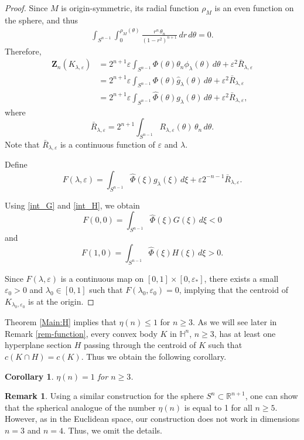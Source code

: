 \documentclass[12pt,letterpaper,reqno]{amsart}
\newtheorem{corollary}[theorem]{Corollary}
\theoremstyle{definition}
\newtheorem{remark}[theorem]{Remark}
\begin{document}
\begin{proof}
Since $M$ is origin-symmetric, its radial function $\rho_M$ is an even function on the sphere, and thus
\begin{align*}  \int_{S^{n-1}}\int_0^{\rho_M(\theta)}   \frac{r^n\, \theta_n}{(1-r^2)^{n+1}}\,dr\, d\theta=0.
\end{align*}
Therefore,
\begin{align*}	\bm{Z}_n({K_{\lambda,\varepsilon}}) 
	& =  2^{n+1}\varepsilon \int_{S^{n-1}}  \Phi(\theta) \theta_n\phi_{\lambda}(\theta) \, d\theta + \varepsilon^2 \bar R_{\lambda,\varepsilon}\\
		& =  2^{n+1}\varepsilon \int_{S^{n-1}}  \Phi(\theta) \widehat g_{\lambda}(\theta) \, d\theta + \varepsilon^2 \bar R_{\lambda,\varepsilon}\\
				& =  2^{n+1}\varepsilon \int_{S^{n-1}}  \widehat \Phi(\theta)  g_{\lambda}(\theta) \, d\theta + \varepsilon^2 \bar R_{\lambda,\varepsilon},
\end{align*}
where
$$  \bar R_{\lambda,\varepsilon} = 2^{n+1}\int_{S^{n-1}} R_{\lambda,\varepsilon}(\theta)\, \theta_n \, d\theta.$$
Note that $\bar R_{\lambda,\varepsilon}$ is a continuous function of $\varepsilon$ and $\lambda$. 

	Define
	$$F(\lambda,\varepsilon)=\int_{S^{n-1}} \widehat\Phi(\xi) g_\lambda (\xi) \, d\xi+\varepsilon 2^{-n-1}  \bar R_{\lambda,\varepsilon}.$$
	
Using \eqref{int_G} and \eqref{int_H}, we obtain
	$$F(0,0)=\int_{S^{n-1}} \widehat\Phi(\xi)    G(\xi) \, d\xi<0$$
	and 
	$$F(1,0)=\int_{S^{n-1}}  \widehat\Phi(\xi) H(\xi) \, d\xi>0.$$
	
	
	Since $F(\lambda, \varepsilon)$ is a continuous map on $[0,1] \times [0, \varepsilon_\ast]$, there exists a small $\varepsilon_0>0$ and $\lambda_0 \in [0,1]$ such that $F(\lambda_0, \varepsilon_0) = 0$, implying that  the centroid of $K_{\lambda_0,\varepsilon_0}$ is at the origin.
	\end{proof}
	
	Theorem 	\ref{Main:H} implies that	$\eta (n)\le 1$ for $n\ge 3$. As we will see later in Remark \ref{rem-function}, every convex body $K$ in $\mathbb H^n$, $n\ge 3$, has at least one hyperplane section $H$ passing through the centroid of $K$ such that $c(K\cap H) = c(K)$. Thus we obtain the following corollary. 
	
\begin{corollary}\label{H:n_ge_3}
	$\eta (n)=1$ for $n\ge 3$.
		\end{corollary}
		
			
 \begin{remark}
 	Using a similar construction  for the sphere $S^{n}\subset \mathbb R^{n+1}$, one can show that the spherical analogue of the number $\eta(n)$ is equal to 1 for all $n\ge 5$. 
 	 However, as in the Euclidean space, our construction does not work in dimensions $n=3$ and $n=4$.  Thus, we omit the details. 
 	\end{remark}
			
\end{document}
